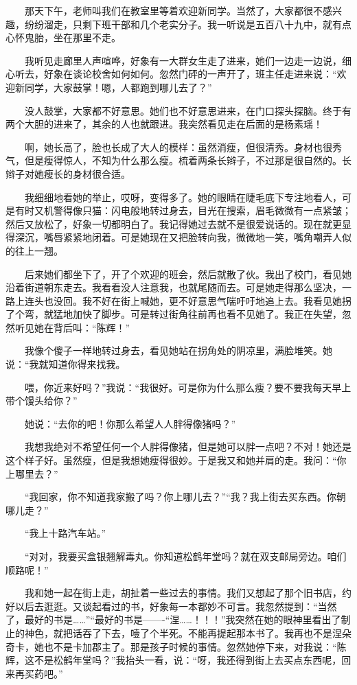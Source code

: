  　　那天下午，老师叫我们在教室里等着欢迎新同学。当然了，大家都很不感兴趣，纷纷溜走，只剩下班干部和几个老实分子。我一听说是五百八十九中，就有点心怀鬼胎，坐在那里不走。 
 
 　　我听见走廊里人声喧哗，好象有一大群女生走了进来，她们一边走一边说，细心听去，好象在谈论校舍如何如何。忽然门砰的一声开了，班主任走进来说：“欢迎新同学，大家鼓掌！嗯，人都跑到哪儿去了？” 
 
 　　没人鼓掌，大家都不好意思。她们也不好意思进来，在门口探头探脑。终于有两个大胆的进来了，其余的人也就跟进。我突然看见走在后面的是杨素瑶！ 
 
 　　啊，她长高了，脸也长成了大人的模样：虽然消瘦，但很清秀。身材也很秀气，但是瘦得惊人，不知为什么那么瘦。梳着两条长辫子，不过那是很自然的。长辫子对她瘦长的身材很合适。 
 
 　　我细细地看她的举止，哎呀，变得多了。她的眼睛在睫毛底下专注地看人，可是有时又机警得像只猫：闪电般地转过身去，目光在搜索，眉毛微微有一点紧皱；然后又放松了，好象一切都明白了。我记得她过去就不是很爱说话的。现在就更显得深沉，嘴唇紧紧地闭着。可是她现在又把脸转向我，微微地一笑，嘴角嘲弄人似的往上一翘。 
 
 　　后来她们都坐下了，开了个欢迎的班会，然后就散了伙。我出了校门，看见她沿着街道朝东走去。我看看没人注意我，也就尾随而去。可是她走得那么坚决，一路上连头也没回。我不好在街上喊她，更不好意思气喘吁吁地追上去。我看见她拐了个弯，就猛地加快了脚步。可是转过街角往前再也看不见她了。我正在失望，忽然听见她在背后叫：“陈辉！” 
 
 　　我像个傻子一样地转过身去，看见她站在拐角处的阴凉里，满脸堆笑。她说：“我就知道你得来找我。 
 
 　　喂，你近来好吗？”我说：“我很好。可是你为什么那么瘦？要不要我每天早上带个馒头给你？” 
 
 　　她说：“去你的吧！你那么希望人人胖得像猪吗？” 
 
 　　我想我绝对不希望任何一个人胖得像猪，但是她可以胖一点吧？不对！她还是这个样子好。虽然瘦，但是我想她瘦得很妙。于是我又和她并肩的走。我问：“你上哪里去？” 
 
 　　“我回家，你不知道我家搬了吗？你上哪儿去？”“我？我上街去买东西。你朝哪儿走？” 
 
 　　“我上十路汽车站。” 
 
 　　“对对，我要买盒银翘解毒丸。你知道松鹤年堂吗？就在双支邮局旁边。咱们顺路呢！” 
 
 　　我和她一起在街上走，胡扯着一些过去的事情。我们又想起了那个旧书店，约好以后去逛逛。又谈起看过的书，好象每一本都妙不可言。我忽然提到：“当然了，最好的书是……”“最好的书是——-“涅……！！！”我突然在她的眼神里看出了制止的神色，就把话吞了下去，噎了个半死。不能再提起那本书了。我再也不是涅朵奇卡，她也不是卡加郡主了。那是孩子时候的事情。忽然她停下来，对我说：“陈辉，这不是松鹤年堂吗？”我抬头一看，说：“呀，我还得到街上去买点东西呢，回来再买药吧。” 
 
